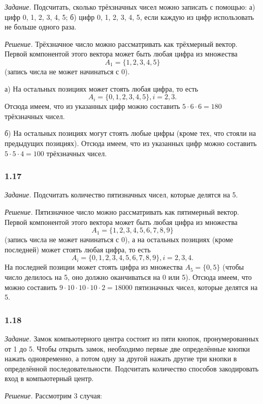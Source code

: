 \documentclass{book}
\begin{document}
\textit{Задание.} Подсчитать, сколько трёхзначных чисел можно записать с помощью:
а) цифр 0, 1, 2, 3, 4, 5;
б) цифр 0, 1, 2, 3, 4, 5, если каждую из цифр использовать не больше одного раза.

\textit{Решение.} Трёхзначное число можно рассматривать как трёхмерный вектор.
Первой компонентой этого вектора может быть любая цифра из множества
$$ A_1 = \{ 1, 2, 3, 4, 5 \} $$
(запись числа не может начинаться с 0).

а) На остальных позициях может стоять любая цифра, то есть
$$ A_i = \{ 0, 1, 2, 3, 4, 5 \}, i = 2, 3.$$
Отсюда имеем, что из указанных цифр можно составить $ 5 \cdot 6 \cdot 6 = 180$ трёхзначных чисел.

б) На остальных позициях могут стоять любые цифры (кроме тех, что стояли на предыдущих позициях).
Отсюда имеем, что из указанных цифр можно составить $ 5 \cdot 5 \cdot 4 = 100 $ трёхзначных чисел.

\subsubsection*{1.17}

\textit{Задание.} Подсчитать количество пятизначных чисел, которые делятся на 5.

\textit{Решение.} Пятизначное число можно рассматривать как пятимерный вектор.
Первой компонентой этого вектора может быть любая цифра из множества
$$ A_1 = \{ 1, 2, 3, 4, 5, 6, 7, 8, 9 \} $$
(запись числа не может начинаться с 0), а на остальных позициях (кроме последней) может стоять любая цифра, то есть
$$ A_i = \{ 0, 1, 2, 3, 4, 5, 6, 7, 8, 9 \}, i = 2, 3, 4.$$
На последней позиции может стоять цифра из множества $ A_5 = \{ 0, 5 \}$ (чтобы число делилось на 5, оно должно оканчиваться на 0 или 5).
Отсюда имеем, что можно составить $ 9 \cdot 10 \cdot 10 \cdot 10 \cdot 2 = 18000$ пятизначных чисел, которые делятся на 5.

\subsubsection*{1.18}

\textit{Задание.} Замок компьютерного центра состоит из пяти кнопок, пронумерованных от 1 до 5.
Чтобы открыть замок, необходимо первые две определённые кнопки нажать одновременно, а потом одну за другой нажать другие три кнопки в определённой последовательности. Подсчитать количество способов закодировать вход в компьютерный центр.

\textit{Решение.} Рассмотрим 3 случая: 
\end{document}
